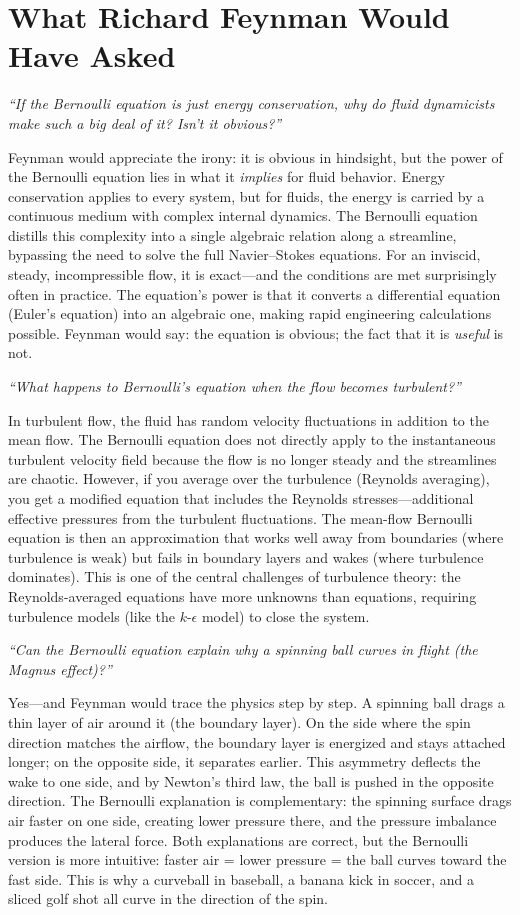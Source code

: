 \documentclass[11pt,openright]{book}
\begin{document}
\section*{What Richard Feynman Would Have Asked}

\textit{``If the Bernoulli equation is just energy conservation, why do fluid dynamicists make such a big deal of it? Isn't it obvious?''}

Feynman would appreciate the irony: it is obvious in hindsight, but the power of the Bernoulli equation lies in what it \emph{implies} for fluid behavior. Energy conservation applies to every system, but for fluids, the energy is carried by a continuous medium with complex internal dynamics. The Bernoulli equation distills this complexity into a single algebraic relation along a streamline, bypassing the need to solve the full Navier--Stokes equations. For an inviscid, steady, incompressible flow, it is exact---and the conditions are met surprisingly often in practice. The equation's power is that it converts a differential equation (Euler's equation) into an algebraic one, making rapid engineering calculations possible. Feynman would say: the equation is obvious; the fact that it is \emph{useful} is not.

\textit{``What happens to Bernoulli's equation when the flow becomes turbulent?''}

In turbulent flow, the fluid has random velocity fluctuations in addition to the mean flow. The Bernoulli equation does not directly apply to the instantaneous turbulent velocity field because the flow is no longer steady and the streamlines are chaotic. However, if you average over the turbulence (Reynolds averaging), you get a modified equation that includes the Reynolds stresses---additional effective pressures from the turbulent fluctuations. The mean-flow Bernoulli equation is then an approximation that works well away from boundaries (where turbulence is weak) but fails in boundary layers and wakes (where turbulence dominates). This is one of the central challenges of turbulence theory: the Reynolds-averaged equations have more unknowns than equations, requiring turbulence models (like the $k$-$\epsilon$ model) to close the system.

\textit{``Can the Bernoulli equation explain why a spinning ball curves in flight (the Magnus effect)?''}

Yes---and Feynman would trace the physics step by step. A spinning ball drags a thin layer of air around it (the boundary layer). On the side where the spin direction matches the airflow, the boundary layer is energized and stays attached longer; on the opposite side, it separates earlier. This asymmetry deflects the wake to one side, and by Newton's third law, the ball is pushed in the opposite direction. The Bernoulli explanation is complementary: the spinning surface drags air faster on one side, creating lower pressure there, and the pressure imbalance produces the lateral force. Both explanations are correct, but the Bernoulli version is more intuitive: faster air = lower pressure = the ball curves toward the fast side. This is why a curveball in baseball, a banana kick in soccer, and a sliced golf shot all curve in the direction of the spin.
\end{document}
